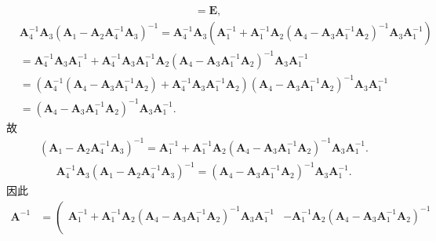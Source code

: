 \documentclass[../../main.tex]{subfiles}
\begin{document}
\begin{solution}
\begin{align*}
\\
&=\boldsymbol{E},
\end{align*}
\begin{align*}
&\boldsymbol{A}_{4}^{-1}\boldsymbol{A}_3(\boldsymbol{A}_1-\boldsymbol{A}_2\boldsymbol{A}_{4}^{-1}\boldsymbol{A}_3)^{-1}=\boldsymbol{A}_{4}^{-1}\boldsymbol{A}_3\left( \boldsymbol{A}_{1}^{-1}+\boldsymbol{A}_{1}^{-1}\boldsymbol{A}_2\left( \boldsymbol{A}_4-\boldsymbol{A}_3\boldsymbol{A}_{1}^{-1}\boldsymbol{A}_2 \right) ^{-1}\boldsymbol{A}_3\boldsymbol{A}_{1}^{-1} \right) 
\\
&=\boldsymbol{A}_{4}^{-1}\boldsymbol{A}_3\boldsymbol{A}_{1}^{-1}+\boldsymbol{A}_{4}^{-1}\boldsymbol{A}_3\boldsymbol{A}_{1}^{-1}\boldsymbol{A}_2\left( \boldsymbol{A}_4-\boldsymbol{A}_3\boldsymbol{A}_{1}^{-1}\boldsymbol{A}_2 \right) ^{-1}\boldsymbol{A}_3\boldsymbol{A}_{1}^{-1}
\\
&=\left( \boldsymbol{A}_{4}^{-1}\left( \boldsymbol{A}_4-\boldsymbol{A}_3\boldsymbol{A}_{1}^{-1}\boldsymbol{A}_2 \right) +\boldsymbol{A}_{4}^{-1}\boldsymbol{A}_3\boldsymbol{A}_{1}^{-1}\boldsymbol{A}_2 \right) \left( \boldsymbol{A}_4-\boldsymbol{A}_3\boldsymbol{A}_{1}^{-1}\boldsymbol{A}_2 \right) ^{-1}\boldsymbol{A}_3\boldsymbol{A}_{1}^{-1}
\\
&=\left( \boldsymbol{A}_4-\boldsymbol{A}_3\boldsymbol{A}_{1}^{-1}\boldsymbol{A}_2 \right) ^{-1}\boldsymbol{A}_3\boldsymbol{A}_{1}^{-1}.
\end{align*}
故
\begin{align*}
\left( \boldsymbol{A}_1-\boldsymbol{A}_2\boldsymbol{A}_{4}^{-1}\boldsymbol{A}_3 \right) ^{-1}=\boldsymbol{A}_{1}^{-1}+\boldsymbol{A}_{1}^{-1}\boldsymbol{A}_2\left( \boldsymbol{A}_4-\boldsymbol{A}_3\boldsymbol{A}_{1}^{-1}\boldsymbol{A}_2 \right) ^{-1}\boldsymbol{A}_3\boldsymbol{A}_{1}^{-1}.
\end{align*}
\begin{align*}
\boldsymbol{A}_{4}^{-1}\boldsymbol{A}_3(\boldsymbol{A}_1-\boldsymbol{A}_2\boldsymbol{A}_{4}^{-1}\boldsymbol{A}_3)^{-1}=\left( \boldsymbol{A}_4-\boldsymbol{A}_3\boldsymbol{A}_{1}^{-1}\boldsymbol{A}_2 \right) ^{-1}\boldsymbol{A}_3\boldsymbol{A}_{1}^{-1}.
\end{align*}
因此
\begin{align*}
\boldsymbol{A}^{-1}&=\left( \begin{matrix}
\boldsymbol{A}_{1}^{-1}+\boldsymbol{A}_{1}^{-1}\boldsymbol{A}_2\left( \boldsymbol{A}_4-\boldsymbol{A}_3\boldsymbol{A}_{1}^{-1}\boldsymbol{A}_2 \right) ^{-1}\boldsymbol{A}_3\boldsymbol{A}_{1}^{-1}&		-\boldsymbol{A}_{1}^{-1}\boldsymbol{A}_2\left( \boldsymbol{A}_4-\boldsymbol{A}_3\boldsymbol{A}_{1}^{-1}\boldsymbol{A}_2 \right) ^{-1}\\

\end{matrix}
\end{align*}
\end{solution}
\end{document}
